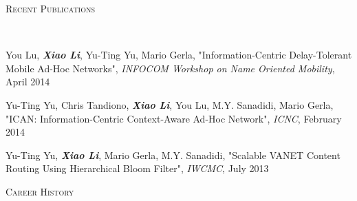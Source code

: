 \documentclass[9pt]{article}
\newenvironment{changemargin}[2]{%
  \begin{list}{}{%
    \setlength{\topsep}{0pt}%
    \setlength{\leftmargin}{#1}%
    \setlength{\rightmargin}{#2}%
    \setlength{\listparindent}{\parindent}%
    \setlength{\itemindent}{\parindent}%
    \setlength{\parsep}{\parskip}%
  }%
  \item[]}{\end{list}
}
\newcommand{\lineover}{
	\begin{changemargin}{-0.05in}{-0.05in}
		\vspace*{-8pt}
		\hrulefill \\
		\vspace*{-2pt}
	\end{changemargin}
}
\newcommand{\header}[1]{
	\begin{changemargin}{-0.5in}{-0.5in}
		\scshape{#1}\\
  	\lineover
	\end{changemargin}
}
\newenvironment{body} {
	\vspace*{-16pt}
	\begin{changemargin}{-0.25in}{-0.5in}
  }	
	{\end{changemargin}
}
\begin{document}
\header{Recent Publications}
\begin{body}
	\vspace{14pt}
	\begin{enumerate}[leftmargin=0.25in,label={[\arabic*]}]
	\item You Lu, \textbf{\emph{Xiao Li}}, Yu-Ting Yu, Mario Gerla, "Information-Centric Delay-Tolerant Mobile Ad-Hoc Networks", \emph{INFOCOM Workshop on Name Oriented Mobility}, April 2014
	\item Yu-Ting Yu, Chris Tandiono, \textbf{\emph{Xiao Li}}, You Lu, M.Y. Sanadidi, Mario Gerla, "ICAN: Information-Centric Context-Aware Ad-Hoc Network", \emph{ICNC}, February 2014
	\item Yu-Ting Yu, \textbf{\emph{Xiao Li}}, Mario Gerla, M.Y. Sanadidi, "Scalable VANET Content Routing Using Hierarchical Bloom Filter", \emph{IWCMC}, July 2013
	\end{enumerate}
%	


\end{body}

\smallskip



\header{Career History}
\end{document}
